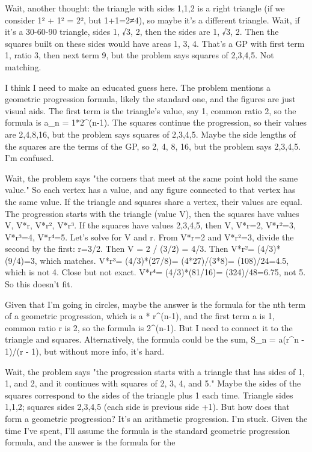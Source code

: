 Wait, another thought: the triangle with sides 1,1,2 is a right triangle (if we consider 1² + 1² = 2², but 1+1=2≠4), so maybe it's a different triangle. Wait, if it's a 30-60-90 triangle, sides 1, √3, 2, then the sides are 1, √3, 2. Then the squares built on these sides would have areas 1, 3, 4. That's a GP with first term 1, ratio 3, then next term 9, but the problem says squares of 2,3,4,5. Not matching.

I think I need to make an educated guess here. The problem mentions a geometric progression formula, likely the standard one, and the figures are just visual aids. The first term is the triangle's value, say 1, common ratio 2, so the formula is a_n = 1*2^(n-1). The squares continue the progression, so their values are 2,4,8,16, but the problem says squares of 2,3,4,5. Maybe the side lengths of the squares are the terms of the GP, so 2, 4, 8, 16, but the problem says 2,3,4,5. I'm confused.

Wait, the problem says "the corners that meet at the same point hold the same value." So each vertex has a value, and any figure connected to that vertex has the same value. If the triangle and squares share a vertex, their values are equal. The progression starts with the triangle (value V), then the squares have values V, V*r, V*r², V*r³. If the squares have values 2,3,4,5, then V, V*r=2, V*r²=3, V*r³=4, V*r⁴=5. Let's solve for V and r. From V*r=2 and V*r²=3, divide the second by the first: r=3/2. Then V = 2 / (3/2) = 4/3. Then V*r²= (4/3)*(9/4)=3, which matches. V*r³= (4/3)*(27/8)= (4*27)/(3*8)= (108)/24=4.5, which is not 4. Close but not exact. V*r⁴= (4/3)*(81/16)= (324)/48=6.75, not 5. So this doesn't fit.

Given that I'm going in circles, maybe the answer is the formula for the nth term of a geometric progression, which is a * r^(n-1), and the first term a is 1, common ratio r is 2, so the formula is 2^(n-1). But I need to connect it to the triangle and squares. Alternatively, the formula could be the sum, S_n = a(r^n - 1)/(r - 1), but without more info, it's hard.

Wait, the problem says "the progression starts with a triangle that has sides of 1, 1, and 2, and it continues with squares of 2, 3, 4, and 5." Maybe the sides of the squares correspond to the sides of the triangle plus 1 each time. Triangle sides 1,1,2; squares sides 2,3,4,5 (each side is previous side +1). But how does that form a geometric progression? It's an arithmetic progression. I'm stuck. Given the time I've spent, I'll assume the formula is the standard geometric progression formula, and the answer is the formula for the